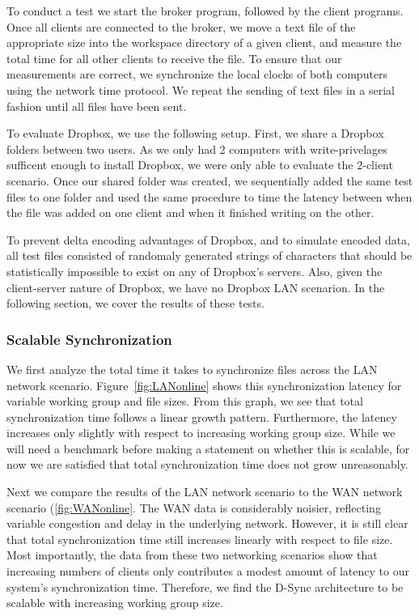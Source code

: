 To conduct a test we start the broker program, followed by the
client programs.
Once all clients are connected to the broker,
we move a text file of the appropriate
size into the workspace directory of a given client,
and measure the total time for all other clients
to receive the file.
To ensure that our measurements are correct,
we synchronize the local clocks of both computers
using the network time protocol.
We repeat the sending of text files in a serial fashion
until all files have been sent.

To evaluate Dropbox, we use the following setup.
First, we share a Dropbox folders between two users. As we only
had 2 computers with write-privelages sufficent enough to install 
Dropbox, we were only able to evaluate the 2-client scenario. Once 
our shared folder was created, we sequentially added the same test
files to one folder and used the same procedure to time the latency
between when the file was added on one client and when it finished 
writing on the other.

To prevent delta encoding advantages of Dropbox, and to simulate encoded
data, all test files consisted of randomaly generated strings of 
characters that should be statistically impossible to exist
on any of Dropbox's servers. Also, given the client-server nature of
Dropbox, we have no Dropbox LAN scenarion.
In the following section, we cover the results of these tests.

\subsubsection{Scalable Synchronization}
We first analyze the total time it takes to synchronize files
across the LAN network scenario.  Figure~\ref{fig:LANonline} 
shows this synchronization latency for variable working group and
file sizes. From this graph,
we see that total synchronization time follows a linear growth pattern.
Furthermore, the latency increases only slightly with respect
to increasing working group size.
While we will need a benchmark before making a statement
on whether this is scalable,
for now we are satisfied that total synchronization time
    does not grow unreasonably.

Next we compare the results of the LAN network scenario to the WAN network scenario (\ref{fig:WANonline}.
The WAN data is considerably noisier,
reflecting variable congestion and delay in the underlying network.
However, it is still clear that total synchronization time still increases
linearly with respect to file size.
Most importantly, the data from these two networking scenarios show
that increasing numbers of clients only contributes a modest
amount of latency to our system's synchronization time.
Therefore, we find the D-Sync architecture to be scalable 
with increasing working group size.

